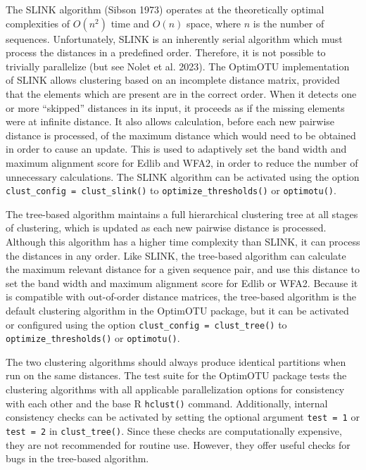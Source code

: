 \documentclass[
]{article}
\begin{document}
The SLINK algorithm (Sibson 1973) operates at the theoretically optimal complexities of \(O(n^2)\) time and \(O(n)\) space, where \(n\) is the number of sequences.
Unfortunately, SLINK is an inherently serial algorithm which must process the distances in a predefined order.
Therefore, it is not possible to trivially parallelize (but see Nolet et al. 2023).
The OptimOTU implementation of SLINK allows clustering based on an incomplete distance matrix, provided that the elements which are present are in the correct order.
When it detects one or more ``skipped'' distances in its input, it proceeds as if the missing elements were at infinite distance.
It also allows calculation, before each new pairwise distance is processed, of the maximum distance which would need to be obtained in order to cause an update.
This is used to adaptively set the band width and maximum alignment score for Edlib and WFA2, in order to reduce the number of unnecessary calculations.
The SLINK algorithm can be activated using the option \texttt{clust\_config\ =\ clust\_slink()} to \texttt{optimize\_thresholds()} or \texttt{optimotu()}.

The tree-based algorithm maintains a full hierarchical clustering tree at all stages of clustering, which is updated as each new pairwise distance is processed.
Although this algorithm has a higher time complexity than SLINK, it can process the distances in any order.
Like SLINK, the tree-based algorithm can calculate the maximum relevant distance for a given sequence pair, and use this distance to set the band width and maximum alignment score for Edlib or WFA2.
Because it is compatible with out-of-order distance matrices, the tree-based algorithm is the default clustering algorithm in the OptimOTU package, but it can be activated or configured using the option \texttt{clust\_config\ =\ clust\_tree()} to \texttt{optimize\_thresholds()} or \texttt{optimotu()}.

The two clustering algorithms should always produce identical partitions when run on the same distances.
The test suite for the OptimOTU package tests the clustering algorithms with all applicable parallelization options for consistency with each other and the base R \texttt{hclust()} command.
Additionally, internal consistency checks can be activated by setting the optional argument \texttt{test\ =\ 1} or \texttt{test\ =\ 2} in \texttt{clust\_tree()}.
Since these checks are computationally expensive, they are not recommended for routine use.
However, they offer useful checks for bugs in the tree-based algorithm.
\end{document}
